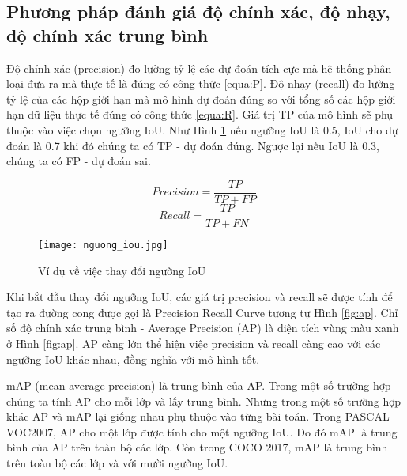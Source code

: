 \documentclass[../the.tex]{subfiles}
\begin{document}
\subsection{Phương pháp đánh giá độ chính xác, độ nhạy, độ chính xác trung bình}
{\fontsize{13}{12} \selectfont

	Độ chính xác (precision) đo lường tỷ lệ các dự đoán tích cực mà hệ thống phân loại đưa ra
	mà thực tế là đúng có công thức \ref{equa:P}.
	Độ nhạy (recall) đo lường tỷ lệ của các hộp giới hạn mà mô hình dự đoán đúng so với tổng số các hộp giới hạn dữ liệu thực tế đúng có công thức \ref{equa:R}.
	Giá trị TP của mô hình sẽ phụ thuộc vào việc chọn ngưỡng IoU.
	Như Hình \ref{fig:nguong_iou} nếu ngưỡng IoU là 0.5, IoU cho dự đoán là 0.7 khi đó chúng ta có TP - dự đoán đúng. Ngược lại nếu IoU là 0.3, chúng ta có FP - dự đoán sai.

	\begin{equation}
		Precision = \frac{TP}{TP+FP}\
		\label{equa:P}
	\end{equation}
	\begin{equation}
		Recall = \frac{TP}{TP+FN}\
		\label{equa:R}
	\end{equation}

}
\begin{figure}[H]
	\centering
	\texttt{[image: nguong\_iou.jpg]}
	\caption{Ví dụ về việc thay đổi ngưỡng IoU}
	\label{fig:nguong_iou}
\end{figure}

{\fontsize{13}{12} \selectfont

Khi bắt đầu thay đổi ngưỡng IoU, các giá trị precision và recall sẽ được tính để tạo ra đường cong được gọi là Precision Recall Curve tương tự Hình \ref{fig:ap}.
Chỉ số độ chính xác trung bình - Average Precision (AP) là diện tích vùng màu xanh ở Hình \ref{fig:ap}. AP càng lớn thể hiện việc precision và recall càng cao với các ngưỡng IoU khác nhau, đồng nghĩa với mô hình tốt.

}

\bigskip

{\fontsize{13}{12} \selectfont

	mAP (mean average precision) là trung bình của AP. Trong một số trường hợp chúng ta tính AP cho mỗi lớp và lấy trung bình. Nhưng trong một số trường hợp khác AP và mAP lại giống nhau phụ thuộc vào từng bài toán.
	Trong PASCAL VOC2007, AP cho một lớp được tính cho một ngưỡng IoU. Do đó mAP là trung bình của AP trên toàn bộ các lớp.
	Còn trong COCO 2017, mAP là trung bình trên toàn bộ các lớp và với mười ngưỡng IoU.

}
\end{document}
